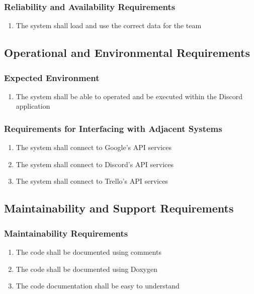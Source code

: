 \documentclass[12pt, titlepage]{article}
\begin{document}
\subsubsection{Reliability and Availability Requirements}
\begin{enumerate}[start=4, label={P\arabic*.}]
    \item The system shall load and use the correct data for the team
\end{enumerate}

\subsection{Operational and Environmental Requirements}
\subsubsection{Expected Environment}
\begin{enumerate}[start=1, label={OE\arabic*.}]
    \item The system shall be able to operated and be executed within the Discord application
\end{enumerate}
\subsubsection{Requirements for Interfacing with Adjacent Systems}
\begin{enumerate}[start=2, label={OE\arabic*.}]
    \item The system shall connect to Google's API services
    \item The system shall connect to Discord's API services
    \item The system shall connect to Trello's API services
\end{enumerate}

\subsection{Maintainability and Support Requirements}
\subsubsection{Maintainability Requirements}
\begin{enumerate}[start=1, label={MS\arabic*.}]
    \item The code shall be documented using comments
    \item The code shall be documented using Doxygen
    \item The code documentation shall be easy to understand
\end{enumerate}
\end{document}
